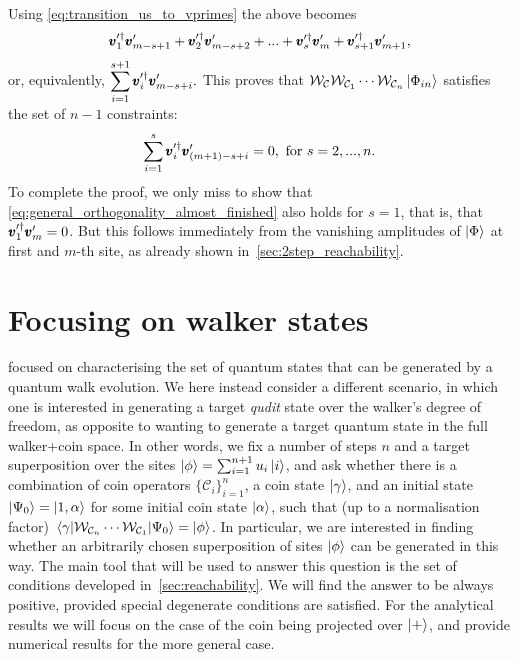 Using \cref{eq:transition_us_to_vprimes} the above becomes
\begin{equation*}
	\pmb{v}^{\prime\dagger}_1 \pmb{v}^\prime_{m-s+1} +
	\pmb{v}^{\prime\dagger}_2 \pmb{v}^\prime_{m-s+2} +
	... +
	\pmb{v}^{\prime\dagger}_s \pmb{v}^\prime_m +
	\pmb{v}^{\prime\dagger}_{s+1} \pmb{v}^\prime_{m+1},
\end{equation*}
or, equivalently,
$\displaystyle
	\sum_{i=1}^{s+1} \pmb{v}^{\prime\dagger}_i \pmb{v}^\prime_{m-s+i}.
$
This proves that
$
	\mathcal W_{\mathcal C}\mathcal W_{\mathcal C_1} \cdots \mathcal W_{\mathcal C_{n}}
	\ket{\Phi_{in}}
$
satisfies the set of $n-1$ constraints:
\begin{equation}
	\sum_{i=1}^{s}
	\pmb{v}^{\prime\dagger}_i
	\pmb{v}^\prime_{(m+1)-s+i} = 0,
	\text{ for }
	s = 2,...,n.
	\label{eq:general_orthogonality_almost_finished}
\end{equation}
To complete the proof, we only miss to show that \cref{eq:general_orthogonality_almost_finished} also holds for $s=1$, that is, that
$\pmb{v}^{\prime\dagger}_1 \pmb{v}^\prime_m = 0$.
But this follows immediately from the vanishing amplitudes of $\ket\Phi$ at first and $m$-th site, as already shown in~\cref{sec:2step_reachability}.
\section{Focusing on walker states}
\label{sec:focusing_walker_states}

 focused on characterising the set of quantum states that can be generated by a quantum walk evolution.
We here instead consider a different scenario, in which one is interested in generating a target \emph{qudit} state over the walker's degree of freedom, as opposite to wanting to generate a target quantum state in the full walker+coin space.
In other words, we fix a number of steps $n$ and a target superposition over the sites $\ket\phi=\sum_{i=1}^{n+1} u_i\ket i$, and ask whether there is a combination of coin operators $\{\mathcal C_i\}_{i=1}^{n}$, a coin state $\ket\gamma$, and an initial state $\ket{\Psi_0}=\ket{1, \alpha}$ for some initial coin state $\ket\alpha$, such that (up to a normalisation factor)
$\mel{\gamma}{\mathcal W_{\mathcal C_{n}} \cdots\mathcal W_{\mathcal C_{1}}}{\Psi_0} = \ket\phi$.
In particular, we are interested in finding whether an arbitrarily chosen superposition of sites $\ket\phi$ can be generated in this way.
The main tool that will be used to answer this question is the set of conditions developed in~\cref{sec:reachability}.
We will find the answer to be always positive, provided special degenerate conditions are satisfied.
For the analytical results we will focus on the case of the coin being projected over $\ket+$,
and provide numerical results for the more general case.

